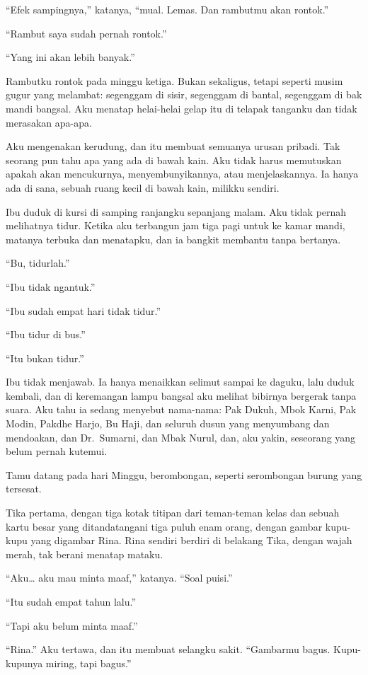 \documentclass[11pt,twoside,openany]{book}
\makeatletter
\newcommand{\scenebreak}{\par\vspace{0.9em}{\centering\textsc{*\hspace{0.7em}*\hspace{0.7em}*}\par}\vspace{0.9em}\@afterindentfalse\@afterheading}
\makeatother
\begin{document}
``Efek sampingnya,'' katanya, ``mual. Lemas. Dan rambutmu akan rontok.''

``Rambut saya sudah pernah rontok.''

``Yang ini akan lebih banyak.''

Rambutku rontok pada minggu ketiga. Bukan sekaligus, tetapi seperti musim gugur yang melambat: segenggam di sisir, segenggam di bantal, segenggam di bak mandi bangsal. Aku menatap helai-helai gelap itu di telapak tanganku dan tidak merasakan apa-apa.

Aku mengenakan kerudung, dan itu membuat semuanya urusan pribadi. Tak seorang pun tahu apa yang ada di bawah kain. Aku tidak harus memutuskan apakah akan mencukurnya, menyembunyikannya, atau menjelaskannya. Ia hanya ada di sana, sebuah ruang kecil di bawah kain, milikku sendiri.

Ibu duduk di kursi di samping ranjangku sepanjang malam. Aku tidak pernah melihatnya tidur. Ketika aku terbangun jam tiga pagi untuk ke kamar mandi, matanya terbuka dan menatapku, dan ia bangkit membantu tanpa bertanya.

``Bu, tidurlah.''

``Ibu tidak ngantuk.''

``Ibu sudah empat hari tidak tidur.''

``Ibu tidur di bus.''

``Itu bukan tidur.''

Ibu tidak menjawab. Ia hanya menaikkan selimut sampai ke daguku, lalu duduk kembali, dan di keremangan lampu bangsal aku melihat bibirnya bergerak tanpa suara. Aku tahu ia sedang menyebut nama-nama: Pak Dukuh, Mbok Karni, Pak Modin, Pakdhe Harjo, Bu Haji, dan seluruh dusun yang menyumbang dan mendoakan, dan Dr.~Sumarni, dan Mbak Nurul, dan, aku yakin, seseorang yang belum pernah kutemui.

\scenebreak
Tamu datang pada hari Minggu, berombongan, seperti serombongan burung yang tersesat.

Tika pertama, dengan tiga kotak titipan dari teman-teman kelas dan sebuah kartu besar yang ditandatangani tiga puluh enam orang, dengan gambar kupu-kupu yang digambar Rina. Rina sendiri berdiri di belakang Tika, dengan wajah merah, tak berani menatap mataku.

``Aku\ldots{} aku mau minta maaf,'' katanya. ``Soal puisi.''

``Itu sudah empat tahun lalu.''

``Tapi aku belum minta maaf.''

``Rina.'' Aku tertawa, dan itu membuat selangku sakit. ``Gambarmu bagus. Kupu-kupunya miring, tapi bagus.''
\end{document}
